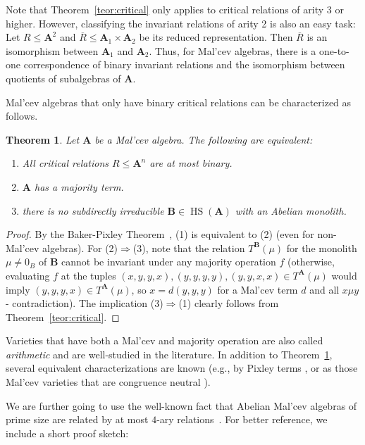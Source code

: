 \documentclass[12pt]{amsart}
\newtheorem{theorem}{Theorem}[section]
\theoremstyle{definition}
\theoremstyle{definition}
\newcommand{\alg}[1]{\mathbf{#1}}
\newcommand{\algA}{\alg{A}}
\newcommand{\algB}{\alg{B}}
\DeclareMathOperator{\HS}{HS}
\begin{document}
Note that Theorem~\ref{teor:critical} only applies to critical relations of arity 3 or higher. However, classifying the invariant relations of arity 2 is also an easy task: Let $R \leq \alg{A}^2$ and $\overline R \leq \alg{A}_1 \times \alg{A}_2$ be its reduced representation. Then $\overline R$ is an isomorphism between $\alg{A}_1$ and $\alg{A}_2$. Thus, for Mal'cev algebras, there is a one-to-one correspondence of binary invariant relations and the isomorphism between quotients of subalgebras of $\algA$.


Mal'cev algebras that only have binary critical relations can be characterized as follows.

\begin{theorem} \label{thm:majority}
Let $\algA$ be a Mal'cev algebra. The following are equivalent:
\begin{enumerate}
\item All critical relations $R\leq \algA^n$ are at most binary.
\item $\algA$ has a majority term.
\item there is no subdirectly irreducible $\algB \in \HS(\algA)$ with an Abelian monolith.
\end{enumerate}
\end{theorem}
\begin{proof}
By the Baker-Pixley Theorem~\cite{BakerPixley}, (1) is equivalent to (2) (even for non-Mal'cev algebras). For (2)$\Rightarrow$(3), note that the relation $T^\algB(\mu)$ for the monolith $\mu\neq 0_B$ of $\algB$ cannot be invariant under any majority operation $f$ (otherwise, evaluating $f$ at the tuples $(x,y,y,x), (y,y,y,y), (y,y,x,x) \in T^\algA(\mu)$ would imply $(y,y,y,x)\in T^\algA(\mu)$, so $x=d(y,y,y)$ for a Mal'cev term $d$ and all $x \mu y$ - contradiction). The implication (3)$\Rightarrow$(1) clearly follows from Theorem~\ref{teor:critical}.
\end{proof}

Varieties that have both a Mal'cev and majority operation are also called \emph{arithmetic} and are well-studied in the literature. In addition to Theorem~\ref{thm:majority}, several equivalent characterizations are known (e.g., by Pixley terms \cite[Theorem 4.70]{Bergman}, or as those Mal'cev varieties that are congruence neutral \cite[Theorem 7.50]{Bergman}).

We are further going to use the well-known fact that Abelian Mal'cev algebras of prime size are related by at most $4$-ary relations~\cite{BagyinskiDemetrovics82}. For better reference, we include a short proof sketch:
\end{document}
